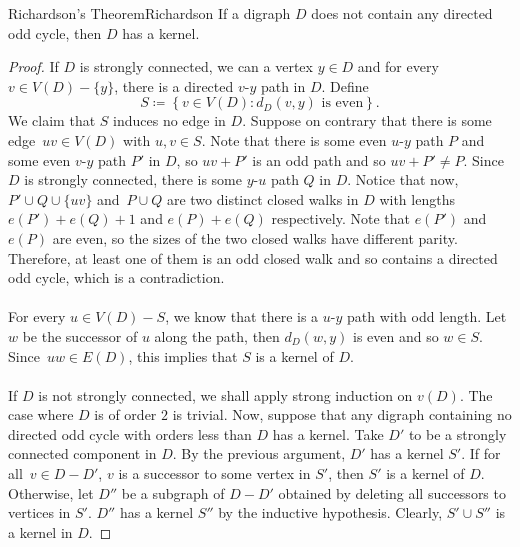 \documentclass[math]{amznotes}
\theoremstyle{remark}
\newcommand{\0}{\mathbf{0}}
\newcommand{\1}{\mathbf{1}}
\begin{document}
\begin{thmbox}{Richardson's Theorem}{Richardson}
    If a digraph $D$ does not contain any directed odd cycle, then $D$ has a kernel.
    \tcblower
    \begin{proof}
        If $D$ is strongly connected, we can a vertex $y \in D$ and for every $v \in V(D) - \{y\}$, there is a directed $v$-$y$ path in $D$. Define 
        \begin{equation*}
            S \coloneqq \left\{v \in V(D) \colon d_{D}(v, y) \textrm{ is even}\right\}.
        \end{equation*}
        We claim that $S$ induces no edge in $D$. Suppose on contrary that there is some edge~$uv \in V(D)$ with $u, v \in S$. Note that there is some even $u$-$y$ path $P$ and some even $v$-$y$ path $P'$ in $D$, so $uv + P'$ is an odd path and so $uv + P' \neq P$. Since $D$ is strongly connected, there is some $y$-$u$ path $Q$ in $D$. Notice that now, $P' \cup Q \cup \{uv\}$ and~$P \cup Q$ are two distinct closed walks in $D$ with lengths $e(P') + e(Q) + 1$ and $e(P) + e(Q)$ respectively. Note that $e(P')$ and $e(P)$ are even, so the sizes of the two closed walks have different parity. Therefore, at least one of them is an odd closed walk and so contains a directed odd cycle, which is a contradiction.
        \\\\
        For every $u \in V(D) - S$, we know that there is a $u$-$y$ path with odd length. Let $w$ be the successor of $u$ along the path, then $d_D(w, y)$ is even and so $w \in S$. Since~$uw \in E(D)$, this implies that $S$ is a kernel of $D$.
        \\\\
        If $D$ is not strongly connected, we shall apply strong induction on $v(D)$. The case where $D$ is of order $2$ is trivial. Now, suppose that any digraph containing no directed odd cycle with orders less than $D$ has a kernel. Take $D'$ to be a strongly connected component in $D$. By the previous argument, $D'$ has a kernel $S'$. If for all~$v \in D - D'$, $v$ is a successor to some vertex in $S'$, then $S'$ is a kernel of $D$. Otherwise, let $D''$ be a subgraph of $D - D'$ obtained by deleting all successors to vertices in $S'$. $D''$ has a kernel $S''$ by the inductive hypothesis. Clearly, $S' \cup S''$ is a kernel in $D$.
    \end{proof}
\end{thmbox}
\end{document}
